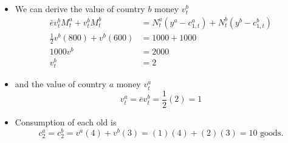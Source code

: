 \documentclass[a4paper,twoside]{article}
\newif\IfInSansMode
\numberwithin{equation}{section}
\numberwithin{figure}{section}
\begin{document}
\begin{itemize}
\begin{itemize}
			\item In the first period, each initial old holds \$4 and \pounds3, regardless of citizenship.
			\item The exchange rate is fixed at \( \bar{e} = 1/2 \) -- \$1 trades for \pounds0.5.
		\end{itemize}
		\item We can derive the value of country \( b \) money \( v^b_t \)
		\begin{align*}
			\bar{e}v_t^b M_t^a + v_t^b M_t^b &= N_t^a \left(y^a - c_{1,t}^a\right) + N_t^b \left(y^b - c_{1,t}^b\right)\\
			\frac{1}{2}v^b(800) +v^b(600) &= 1000 + 1000\\
			1000 v^b &= 2000\\
			v^b_t &= 2
		\end{align*}
		\item and the value of country \( a \) money \( v_t^a \)
		\[
			v^a_t = \bar{e}v^b_t = \frac{1}{2}(2) = 1
		\]
		\item Consumption of each old is
		\[
			c_2^a = c_2^b = v^a(4)+v^b(3) = (1)(4) + (2)(3) = 10 \text{ goods.}
		\]
	\end{itemize}
\end{document}
